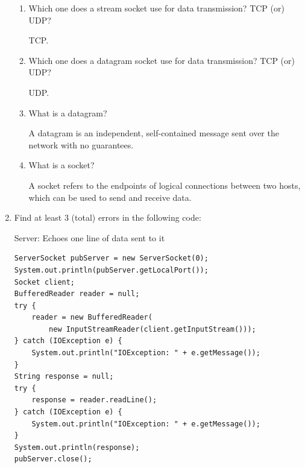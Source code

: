 \documentclass[11pt]{article}
\newenvironment{answer}{\large\lstset{basicstyle=\tiny\ttfamily}\color{white}}{}
\newenvironment{answer}{\large\lstset{basicstyle=\large\ttfamily}\color{red}}{}
\begin{document}
\begin{enumerate}
\begin{enumerate}
		\item Which one does a stream socket use for data transmission? TCP (or) UDP?
		
		\begin{answer}
		TCP. 
		\end{answer}
		
		\item Which one does a datagram socket use for data transmission? TCP (or) UDP?
		
		\begin{answer}
		UDP.
		\end{answer}
		
		\item What is a datagram?
		
		\begin{answer}
		A datagram is an independent, self-contained message sent over the network with no guarantees. %
		\end{answer}
		
		\item What is a socket?
		
		\begin{answer}
		A socket refers to the endpoints of logical connections between two hosts, which can be used to send and receive data.
		\end{answer}
	
	\end{enumerate}


\newpage
\item
	Find at least 3 (total) errors in the following code:

	Server: Echoes one line of data sent to it
	\begin{lstlisting}
ServerSocket pubServer = new ServerSocket(0);
System.out.println(pubServer.getLocalPort());
Socket client;
BufferedReader reader = null;
try {
	reader = new BufferedReader(
		new InputStreamReader(client.getInputStream()));
} catch (IOException e) {
	System.out.println("IOException: " + e.getMessage());
}
String response = null;
try {
	response = reader.readLine();
} catch (IOException e) {
	System.out.println("IOException: " + e.getMessage());
}
System.out.println(response);
pubServer.close();
	\end{lstlisting}


\end{enumerate}
\end{document}
